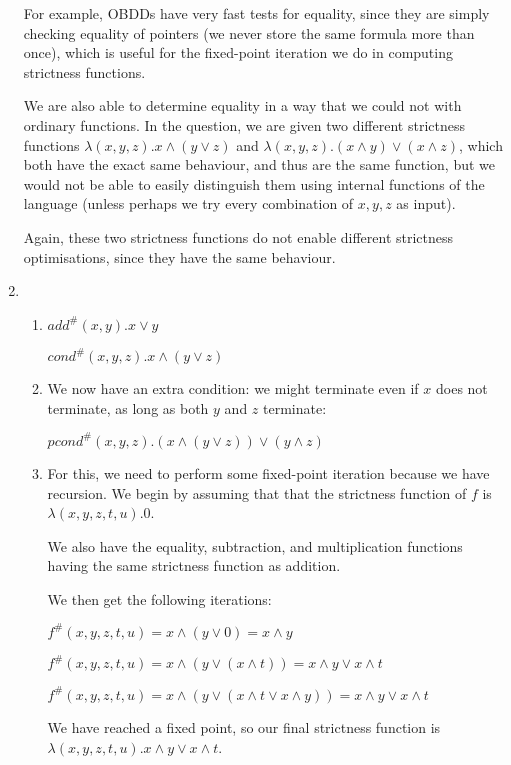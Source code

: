 \begin{enumerate}[label=(\alph*)]
  For example, OBDDs have very fast tests for equality, since they are simply checking equality of pointers (we never store the same formula more than once), which is useful for the fixed-point iteration we do in computing strictness functions.

  We are also able to determine equality in a way that we could not with ordinary functions. In the question, we are given two different strictness functions $\lambda(x,y,z).x \wedge(y \vee z)$ and $\lambda(x,y,z).(x\wedge y)\vee(x \wedge z)$, which both have the exact same behaviour, and thus are the same function, but we would not be able to easily distinguish them using internal functions of the language (unless perhaps we try every combination of $x,y,z$ as input).

  Again, these two strictness functions do not enable different strictness optimisations, since they have the same behaviour.

\item
  \begin{enumerate}[label=(\roman*)]
    \item

      $add^{\#}(x,y). x \vee y$

      $cond^{\#}(x,y,z). x \wedge (y \vee z)$

    \item

      We now have an extra condition: we might terminate even if  $x$ does not terminate, as long as both $y$ and $z$ terminate:

      $pcond^{\#}(x,y,z). (x \wedge (y \vee z)) \vee (y \wedge z)$

    \item

      For this, we need to perform some fixed-point iteration because we have recursion. We begin by assuming that that the strictness function of $f$ is $\lambda (x,y,z,t,u). 0$.

      We also have the equality, subtraction, and multiplication functions having the same strictness function as addition.

      We then get the following iterations:

      $f^{\#}(x,y,z,t,u) = x \wedge (y \vee 0) = x \wedge y$

      $f^{\#}(x,y,z,t,u) = x \wedge (y \vee (x \wedge t)) = x \wedge y \vee x \wedge t$

      $f^{\#}(x,y,z,t,u) = x \wedge (y \vee (x \wedge t \vee x \wedge y)) = x \wedge y \vee x \wedge t$

      We have reached a fixed point, so our final strictness function is $\lambda(x,y,z,t,u). x \wedge y \vee x \wedge t$.

      
  \end{enumerate}


        
\end{enumerate}

